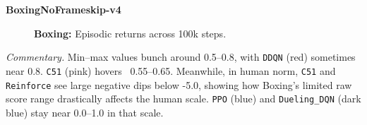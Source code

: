 \noindent
\textbf{BoxingNoFrameskip-v4}
\begin{figure} 
	\centering
	\quad
	\caption{\textbf{Boxing:} Episodic returns across 100k steps.}
	\label{fig:boxing_comparison_combined}
\end{figure}

\noindent
\emph{Commentary.} 
Min--max values bunch around 0.5--0.8, with \texttt{DDQN} (red) sometimes near 0.8. 
\texttt{C51} (pink) hovers ~0.55--0.65. Meanwhile, in human norm, 
\texttt{C51} and \texttt{Reinforce} see large negative dips below -5.0, 
showing how Boxing’s limited raw score range drastically affects the human scale. 
\texttt{PPO} (blue) and \texttt{Dueling\_DQN} (dark blue) stay near 0.0--1.0 
in that scale.

\bigskip

